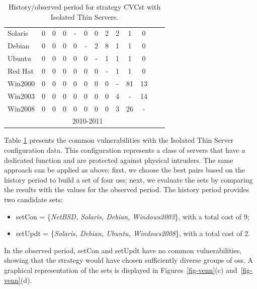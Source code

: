 \begin{table}[!ht]
\begin{center}
{\begin{tabular}{|l|c|c|c|c|c|c|c|c|c|c|c|c|}
Solaris & 0 & 0 & 0 & - & 0 & 0 & 2 & 2 & 1 & 0& \\ \cline{1-11}
Debian & 0 & 0 & 0 & 0 & - & 2 & 8 & 1 & 1 & 0 &\\ \cline{1-11}
Ubuntu & 0 & 0 & 0 & 0 & 0 & - & 1 & 1 & 1 & 0 &\\ \cline{1-11}
Red Hat & 0 & 0 & 0 & 0 & 0 & 0 & - & 1 & 1 & 0 &\\ \cline{1-11}
Win2000 & 0 & 0 & 0 & 0 & 0 & 0 & 0 & - & 81 & 13 &\\ \cline{1-11}
Win2003 & 0 & 0 & 0 & 0 & 0 & 0 & 0 & 4 & - & 14 &\\ \cline{1-12}
Win2008 & 0 & 0 & 0 & 0 & 0 & 0 & 0 & 3 & 26 & - & \multicolumn{1}{|c}{}  \\ \cline{1-11}
 \multicolumn{1}{c|}{}& \multicolumn{9}{|c|}{2010-2011} & \multicolumn{2}{|c}{}\\ \cline{2-10}
\end{tabular}
\caption{History/observed period for strategy CVCst with Isolated Thin Servers.}
\label{tab:strat_i_iso}
}
\end{center}
\end{table}


Table \ref{tab:strat_i_iso} presents the common vulnerabilities with the Isolated Thin Server configuration data. This configuration represents a class of servers that have a dedicated function and are protected against physical intruders. 
The same approach can be applied as above: first, we choose the best pairs based on the history period to build a set of four \glspl{os}; next, we evaluate the sets by comparing the results with the values for the observed period. 
The history period provides two candidate sets: 

\begin{itemize}
\item setCon = \{\emph{NetBSD, Solaris, Debian, Windows2003}\}, with a total cost of 9;
\item setUpdt = \{\emph{Solaris, Debian, Ubuntu, Windows2008}\}, with a total cost of 2.
\end{itemize}

In the observed period, setCon and setUpdt have no common vulnerabilities, showing that the strategy would have chosen sufficiently diverse groups of \glspl{os}. A graphical representation of the sets is displayed in Figures~\ref{fig-venn}(c) and~\ref{fig-venn}(d).

